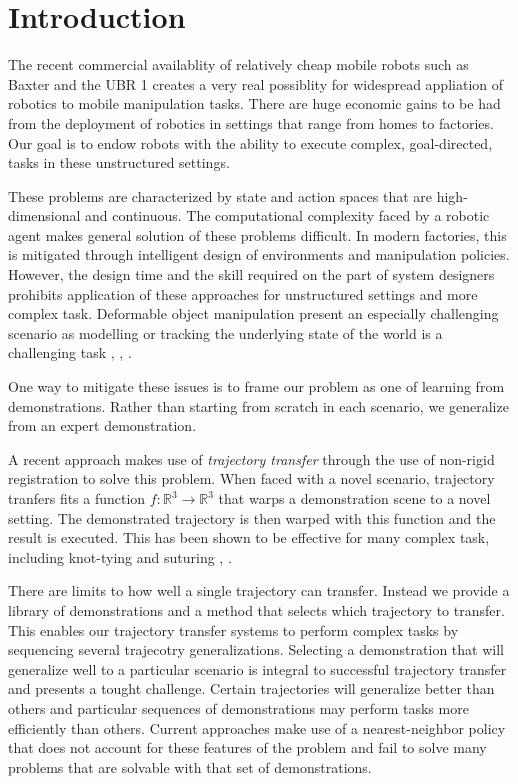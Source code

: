 \section{Introduction}
The recent commercial availablity of relatively cheap mobile robots such as Baxter and the UBR 1 
creates a very real possiblity for widespread appliation of robotics to mobile manipulation tasks.
There are huge economic gains to be had from the deployment of robotics in settings that range from homes to factories.
Our goal is to endow robots with the ability to execute complex, goal-directed, tasks in these unstructured settings.

These problems are characterized by state and action spaces that are high-dimensional and continuous.
The computational complexity faced by a robotic agent makes general solution of these problems difficult.
In modern factories, this is mitigated through intelligent design of environments and manipulation policies.
However, the design time and the skill required on the part of system designers prohibits application of these approaches for unstructured settings and more complex task.
Deformable object manipulation present an especially challenging scenario as modelling or tracking the underlying state of the world is a challenging task \cite{SchulmanLeeHoAbbeel_ICRA2013}, \cite{Javdanietal_2011}, \cite{Haehnel03a}.

One way to mitigate these issues is to frame our problem as one of learning from demonstrations.
Rather than starting from scratch in each scenario, we generalize from an expert demonstration.

A recent approach makes use of \emph{trajectory transfer} through the use of non-rigid registration to solve this problem.
When faced with a novel scenario, trajectory tranfers fits a function $f:\mathbb{R}^3 \rightarrow \mathbb{R}^3$ that warps a demonstration scene to a novel setting.
The demonstrated trajectory is then warped with this function and the result is executed. 
This has been shown to be effective for many complex task, including knot-tying and suturing \cite{Schulmanetal_ISRR2013}, \cite{Schulmanetal_IROS2013}.

There are limits to how well a single trajectory can transfer. 
Instead we provide a library of demonstrations and a method that selects which trajectory to transfer.
This enables our trajectory transfer systems to perform complex tasks by sequencing several trajecotry generalizations.
Selecting a demonstration that will generalize well to a particular scenario is integral to successful trajectory transfer and presents a tought challenge. 
Certain trajectories will generalize better than others and particular sequences of demonstrations may perform tasks more efficiently than others.
Current approaches make use of a nearest-neighbor policy that does not account for these features of the problem and fail to solve many problems that are solvable with that set of demonstrations.

